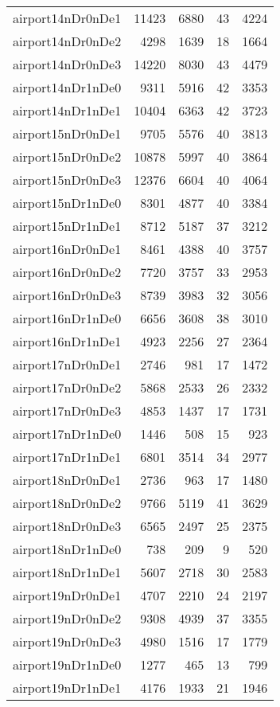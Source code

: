 \begin{longtable}{lrrrr}
airport14nDr0nDe1 & 11423 & 6880 & 43 & 4224 \\
airport14nDr0nDe2 & 4298 & 1639 & 18 & 1664 \\
airport14nDr0nDe3 & 14220 & 8030 & 43 & 4479 \\
airport14nDr1nDe0 & 9311 & 5916 & 42 & 3353 \\
airport14nDr1nDe1 & 10404 & 6363 & 42 & 3723 \\
airport15nDr0nDe1 & 9705 & 5576 & 40 & 3813 \\
airport15nDr0nDe2 & 10878 & 5997 & 40 & 3864 \\
airport15nDr0nDe3 & 12376 & 6604 & 40 & 4064 \\
airport15nDr1nDe0 & 8301 & 4877 & 40 & 3384 \\
airport15nDr1nDe1 & 8712 & 5187 & 37 & 3212 \\
airport16nDr0nDe1 & 8461 & 4388 & 40 & 3757 \\
airport16nDr0nDe2 & 7720 & 3757 & 33 & 2953 \\
airport16nDr0nDe3 & 8739 & 3983 & 32 & 3056 \\
airport16nDr1nDe0 & 6656 & 3608 & 38 & 3010 \\
airport16nDr1nDe1 & 4923 & 2256 & 27 & 2364 \\
airport17nDr0nDe1 & 2746 & 981 & 17 & 1472 \\
airport17nDr0nDe2 & 5868 & 2533 & 26 & 2332 \\
airport17nDr0nDe3 & 4853 & 1437 & 17 & 1731 \\
airport17nDr1nDe0 & 1446 & 508 & 15 & 923 \\
airport17nDr1nDe1 & 6801 & 3514 & 34 & 2977 \\
airport18nDr0nDe1 & 2736 & 963 & 17 & 1480 \\
airport18nDr0nDe2 & 9766 & 5119 & 41 & 3629 \\
airport18nDr0nDe3 & 6565 & 2497 & 25 & 2375 \\
airport18nDr1nDe0 & 738 & 209 & 9 & 520 \\
airport18nDr1nDe1 & 5607 & 2718 & 30 & 2583 \\
airport19nDr0nDe1 & 4707 & 2210 & 24 & 2197 \\
airport19nDr0nDe2 & 9308 & 4939 & 37 & 3355 \\
airport19nDr0nDe3 & 4980 & 1516 & 17 & 1779 \\
airport19nDr1nDe0 & 1277 & 465 & 13 & 799 \\
airport19nDr1nDe1 & 4176 & 1933 & 21 & 1946 \\

\end{longtable}

